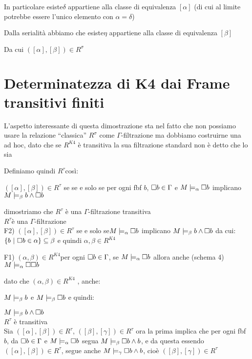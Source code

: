 In particolare esiste$\delta$ appartiene alla classe di equivalenza
$[\alpha]$ (di cui al limite potrebbe essere l'unico elemento con
$\alpha=\delta$)

Dalla serialità abbiamo che esiste$\eta$ appartiene alla classe di
equivalenza $[\beta]$

Da cui $([\alpha],[\beta])\in R^{\sigma}$


\section{Determinatezza di K4 dai Frame transitivi finiti}

L'aspetto interessante di questa dimostrazione sta nel fatto che non
possiamo usare la relazione ``classica'' $R^{\sigma}$ come $\Gamma$-filtrazione
ma dobbiamo costruirne una ad hoc, dato che se $R^{K4}$ è transitiva
la sua filtrazione standard non è detto che lo sia

Definiamo quindi $R^{\tau}$così:

$([\alpha],[\beta])\in R^{\tau}$ se se e solo se per ogni fbf $b$,
$\square b\in\Gamma$ e $M\models_{\alpha}\square b$ implicano $M\models_{\beta}b\wedge\square b$

dimostriamo che $R^{\tau}$ è una $\Gamma$-filtrazione transitiva\\


$R^{\tau}$è una $\Gamma$-filtrazione\\


F2) $([\alpha],[\beta])\in R^{\tau}$ se e solo se$M\models_{\alpha}\square b$
implicano $M\models_{\beta}b\wedge\square b$ da cui: $\{b\ |\ \boxx{b\in\alpha\}\subseteq\beta}$
e quindi $\alpha,\beta\in R^{K4}$

F1) $(\alpha,\beta)\in R^{K4}$per ogni $\square b\in\Gamma$, se $M\models_{\alpha}\square b$
allora anche (schema 4) $M\models_{\alpha}\square\square b$ 

dato che $(\alpha,\beta)\in R^{K4}$ , anche:

$M\models_{\beta}b$ e $M\models_{\beta}\square b$ e quindi:

$M\models_{\beta}b\wedge\square b$\\


$R^{\tau}$ è transitiva\\


Sia $([\alpha],[\beta])\in R^{\tau}$, $([\beta],[\gamma])\in R^{\tau}$
ora la prima implica che per ogni fbf $b$, da $\square b\in\Gamma$
e $M\models_{\alpha}\square b$ segua $M\models_{\beta}\square b\wedge b$,
e da questa essendo $([\alpha],[\beta])\in R^{\tau}$, segue anche
$M\models_{\gamma}\square b\wedge b$, cioè $([\beta],[\gamma])\in R^{\tau}$


